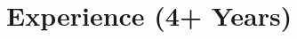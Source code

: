 \documentclass{subfiles}
\begin{document}
\section{Experience (4+ Years)}



% 

% 

% 
\end{document}
